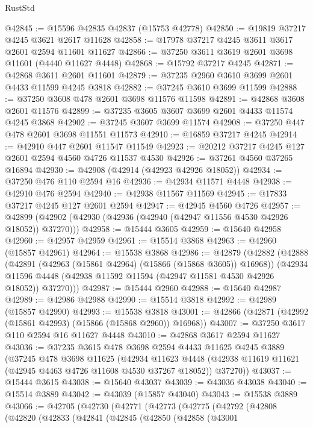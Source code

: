 \begin{lexlean}{RustStd}
\begin{coremodule}
{\begin{coremodule}
{{{{{{{{{{{{{{{{{{{{{{{{{{{{{{{{{{{{{{{{{{{{{{{{{{{{{{{{{{{{@42845 := @15596 @42835 @42837 (@15753 @42778)
@42850 := @19819 @37217 @4245 @3621 @2617 @11628
@42858 := @17978 @37217 @4245 @3611 @3617 @2601 @2594 @11601 @11627
@42866 := @37250 @3611 @3619 @2601 @3698 @11601 (@4440 @11627 @4448)
@42868 := @15792 @37217 @4245
@42871 := @42868 @3611 @2601 @11601
@42879 := @37235 @2960 @3610 @3699 @2601 @4433 @11599 @4245 @3818
@42882 := @37245 @3610 @3699 @11599
@42888 := @37250 @3608 @478 @2601 @3698 @11576 @11598
@42891 := @42868 @3608 @2601 @11576
@42899 := @37235 @3605 @3607 @3699 @2601 @4433 @11574 @4245 @3868
@42902 := @37245 @3607 @3699 @11574
@42908 := @37250 @447 @478 @2601 @3698 @11551 @11573
@42910 := @16859 @37217 @4245
@42914 := @42910 @447 @2601 @11547 @11549
@42923 := @20212 @37217 @4245 @127 @2601 @2594 @4560 @4726 @11537 @4530
@42926 := @37261 @4560 @37265 @16894
@42930 := @42908 (@42914 (@42923 @42926 @18052))
@42934 := @37250 @476 @110 @2594 @16
@42936 := @42934 @11571 @4448
@42938 := @42910 @476 @2594
@42940 := @42938 @11567 @11569
@42945 := @17833 @37217 @4245 @127 @2601 @2594
@42947 := @42945 @4560 @4726
@42957 := @42899 (@42902 (@42930 (@42936 (@42940 (@42947 @11556 @4530 @42926 @18052)) @37270)))
@42958 := @15444 @3605
@42959 := @15640 @42958
@42960 := @42957 @42959
@42961 := @15514 @3868
@42963 := @42960 (@15857 @42961)
@42964 := @15538 @3868
@42986 := @42879
    (@42882
      (@42888
        (@42891 (@42963 (@15861 @42964) (@15866 (@15868 @3605)) @16968))
        (@42934 @11596 @4448 (@42938 @11592 @11594 (@42947 @11581 @4530 @42926 @18052)) @37270)))
@42987 := @15444 @2960
@42988 := @15640 @42987
@42989 := @42986 @42988
@42990 := @15514 @3818
@42992 := @42989 (@15857 @42990)
@42993 := @15538 @3818
@43001 := @42866 (@42871 (@42992 (@15861 @42993) (@15866 (@15868 @2960)) @16968))
@43007 := @37250 @3617 @110 @2594 @16 @11627 @4448
@43010 := @42868 @3617 @2594 @11627
@43036 := @37235
    @3615
    @478
    @3698
    @2594
    @4433
    @11625
    @4245
    @3889
    (@37245
      @478
      @3698
      @11625
      (@42934
        @11623
        @4448
        (@42938 @11619 @11621 (@42945 @4463 @4726 @11608 @4530 @37267 @18052))
        @37270))
@43037 := @15444 @3615
@43038 := @15640 @43037
@43039 := @43036 @43038
@43040 := @15514 @3889
@43042 := @43039 (@15857 @43040)
@43043 := @15538 @3889
@43066 := @42705
    (@42730
      (@42771
        (@42773
          (@42775
            (@42792
              (@42808
                (@42820
                  (@42833
                    (@42841
                      (@42845
                        (@42850
                          (@42858
                            (@43001
}}}}}}}}}}}}}}}}}}}}}}}}}}}}}}}}}}}}}}}}}}}}}}}}}}}}}}}}}}}}
\end{coremodule}}
\end{coremodule}
\end{lexlean}
